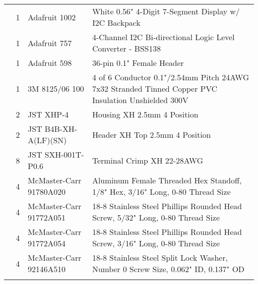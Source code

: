 \begin{longtabu}{X[3,c,m] X[1,c,m] X[3,c,m] X[5,l,m]}
   & 1 & Adafruit 1002 & White 0.56" 4-Digit 7-Segment Display w/ I2C Backpack \\
  & 1 & Adafruit 757 & 4-Channel I2C Bi-directional Logic Level Converter - BSS138 \\
  & 1 & Adafruit 598 & 36-pin 0.1" Female Header \\
  & 1 & 3M 8125/06 100 & 4 of 6 Conductor 0.1"/2.54mm Pitch 24AWG 7x32 Stranded Tinned Copper PVC Insulation Unshielded 300V \\
  & 2 & JST XHP-4 & Housing XH 2.5mm 4 Position \\
  & 2 & JST B4B-XH-A(LF)(SN) & Header XH Top 2.5mm 4 Position \\
  & 8 & JST SXH-001T-P0.6 & Terminal Crimp XH 22-28AWG \\
  & 4 & McMaster-Carr 91780A020 & Aluminum Female Threaded Hex Standoff, 1/8" Hex, 3/16" Long, 0-80 Thread Size \\
  & 4 & McMaster-Carr 91772A051 & 18-8 Stainless Steel Phillips Rounded Head Screw, 5/32" Long, 0-80 Thread Size \\
  & 4 & McMaster-Carr 91772A054 & 18-8 Stainless Steel Phillips Rounded Head Screw, 3/16" Long, 0-80 Thread Size \\
  & 4 & McMaster-Carr 92146A510 & 18-8 Stainless Steel Split Lock Washer, Number 0 Screw Size, 0.062" ID, 0.137" OD \\ \mrule


\end{longtabu}
